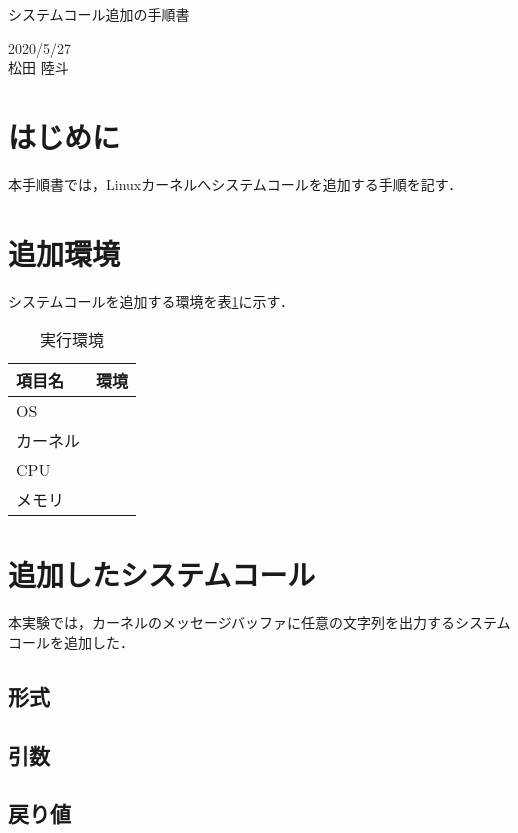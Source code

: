 \documentclass[12pt]{jsarticle}
\begin{document}
\begin{center}
{\LARGE システムコール追加の手順書}
\end{center}

\begin{flushright}
  2020/5/27\\
  松田 陸斗
\end{flushright}
\section{はじめに}
\label{sec:introduction}
本手順書では，Linuxカーネルへシステムコールを追加する手順を記す．

\section{追加環境}
システムコールを追加する環境を表\ref{env}に示す．

\begin{table}[h]
\begin{center}
	\caption{実行環境}\label{env}
	\begin{tabular}{l|l}
	\hline\hline
	\multicolumn{1}{l|}{項目名} & \multicolumn{1}{l}{環境}\\
	\hline
	OS & \\
	カーネル & \\
	CPU & \\
	メモリ & \\
	\hline
	\end{tabular}
\end{center}
\end{table}
\section{追加したシステムコール}
本実験では，カーネルのメッセージバッファに任意の文字列を出力するシステムコールを追加した．
\subsection{形式}
\subsection{引数}
\subsection{戻り値}
\end{document}
